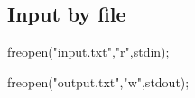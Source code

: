 \subsection{Input by file}

freopen("input.txt","r",stdin);

\noindent freopen("output.txt","w",stdout);
